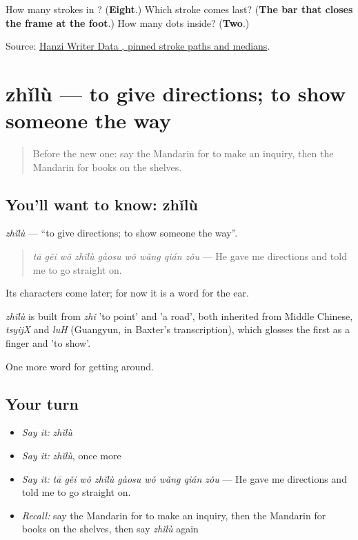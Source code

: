\begin{tcolorbox}[breakable,colback=teal!4,colframe=teal!35!black,title={Before you move on}]
How many strokes in ? (\textbf{Eight}.) Which stroke comes last? (\textbf{The bar that closes the frame at the foot}.) How many dots inside? (\textbf{Two}.)

Source: \href{https://raw.githubusercontent.com/chanind/hanzi-writer-data/68d10a4b21150cae5e1ebbd223eed289cf32d90c/data/\%E5\%9B\%BE.json}{Hanzi Writer Data , pinned stroke paths and medians}.
\end{tcolorbox}
\section[zhǐlù]{zhǐlù — to give directions; to show someone the way}

\label{lesson:ZH-C454-zhilu}



\begin{quote}
Before the new one: say the Mandarin for to make an inquiry, then the Mandarin for books on the shelves.
\end{quote}

\subsection*{You'll want to know: zhǐlù}
\emph{zhǐlù} — \textquotedblleft{}to give directions; to show someone the way\textquotedblright{}.

\begin{quote}
\emph{tā gěi wǒ zhǐlù gàosu wǒ wǎng qián zǒu} — He gave me directions and told me to go straight on.
\end{quote}

Its characters come later; for now it is a word for the ear.

\begin{cousinweb}
\emph{zhǐlù} is built from \emph{zhǐ} 'to point' and  'a road', both inherited from Middle Chinese, \emph{tsyijX} and \emph{luH} (Guangyun, in Baxter's transcription), which glosses the first as a finger and 'to show'.
\end{cousinweb}

\begin{grammarlens}[title={What you've built}]
One more word for getting around.
\end{grammarlens}

\subsection*{Your turn}
\begin{itemize}
\raggedright
  \item \emph{Say it:} \emph{zhǐlù}
  \item \emph{Say it:} \emph{zhǐlù}, once more
  \item \emph{Say it:} \emph{tā gěi wǒ zhǐlù gàosu wǒ wǎng qián zǒu} — He gave me directions and told me to go straight on.
  \item \emph{Recall:} say the Mandarin for to make an inquiry, then the Mandarin for books on the shelves, then say \emph{zhǐlù} again
\end{itemize}

